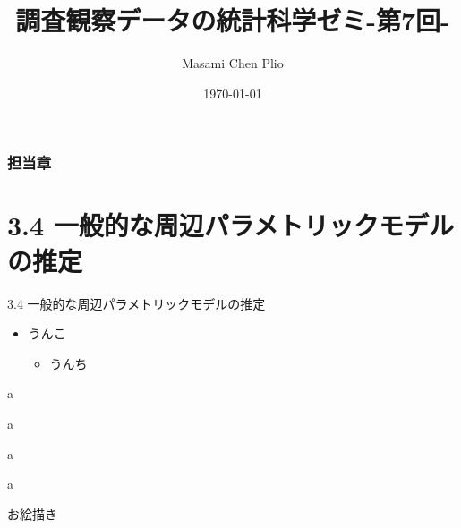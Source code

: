 \documentclass{beamer}
\title[Short title]{調査観察データの統計科学ゼミ-第7回-}
\author{Masami Chen Plio} %
\institute[OU HUS Adachi Lab M1] 
{
Osaka University faculty of Human Sciences\\Adachi Lab M1\\
\medskip
}
\date{\today}
\begin{document}
\begin{frame}
\titlepage
\end{frame}
\begin{frame}
\frametitle{担当章} 
\tableofcontents 
\end{frame}
\section{3.4 一般的な周辺パラメトリックモデルの推定}
\begin{frame}[fragile]{3.4 一般的な周辺パラメトリックモデルの推定}
\begin{itemize}
\setlength{\itemsep}{5mm}
\item うんこ
    \begin{itemize}
    \item うんち
    \end{itemize}
\end{itemize}
\end{frame}
\begin{frame}[fragile]{a}
\end{frame}

\begin{frame}[fragile]{a}
\end{frame}

\begin{frame}[fragile]{a}
\end{frame}

\begin{frame}[fragile]{a}
\end{frame}


\begin{frame}{お絵描き}
\end{frame}
\end{document}
